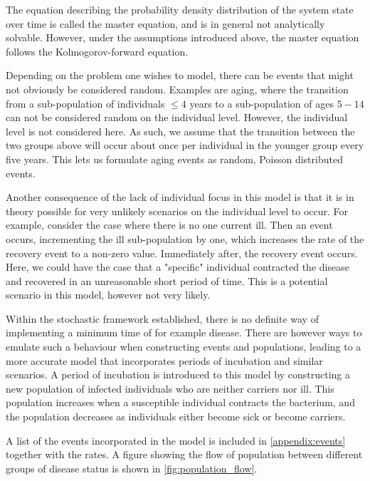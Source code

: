 \documentclass[10pt,a4paper]{article}
\begin{document}
The equation describing the probability density distribution of the system state over time is called the master equation, and is in general not analytically solvable. However, under the assumptions introduced above, the master equation follows the Kolmogorov-forward equation.

Depending on the problem one wishes to model, there can be events that might not obviously be considered random. Examples are aging, where the transition from a sub-population of individuals $\leq 4$ years to a sub-population of ages $5-14$ can not be considered random on the individual level. However, the individual level is not considered here. As such, we assume that the transition between the two groups above will occur about once per individual in the younger group every five years. This lets us formulate aging events as random, Poisson distributed events.

Another consequence of the lack of individual focus in this model is that it is in theory possible for very unlikely scenarios on the individual level to occur. For example, consider the case where there is no one current ill. Then an event occurs, incrementing the ill sub-population by one, which increases the rate of the recovery event to a non-zero value. Immediately after, the recovery event occurs. Here, we could have the case that a "specific" individual contracted the disease and recovered in an unreasonable short period of time. This is a potential scenario in this model, however not very likely.

Within the stochastic framework established, there is no definite way of implementing a minimum time of for example disease. There are however ways to emulate such a behaviour when constructing events and populations, leading to a more accurate model that incorporates periods of incubation and similar scenarios. A period of incubation is introduced to this model by constructing a new population of infected individuals who are neither carriers nor ill. This population increases when a susceptible individual contracts the bacterium, and the population decreases as individuals either become sick or become carriers.

A list of the events incorporated in the model is included in \cref{appendix:events} together with the rates. A figure showing the flow of population between different groups of disease status is shown in \cref{fig:population_flow}.

\end{document}
